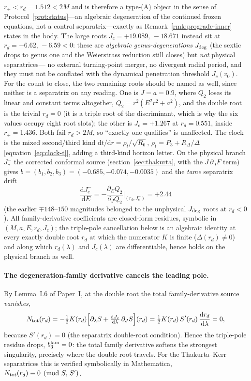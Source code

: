 \documentclass[12pt]{iopart}
\theoremstyle{plain}
\theoremstyle{definition}
\theoremstyle{remark}
\newcommand{\rp}{r_{+}}
\newcommand{\Jc}{J_{c}}
\newcommand{\dd}{\mathrm{d}}
\begin{document}
$\rp<r_d=1.512<2M$ and is therefore a type-(A) object in the sense of
Protocol~\ref{prot:status}---an algebraic degeneration of the continued frozen
equations, not a control separatrix---exactly as Remark~\ref{rmk:prograde-inner}
states in the body. The large
roots $\Jc=+19.089,\,-18.671$ instead sit at $r_d=-6.62,\,-6.59<0$: these are
\emph{algebraic genus-degenerations} $J_{\rm deg}$ (the sextic drops to genus one
and the Weierstrass reduction still closes) but \emph{not} physical separatrices---
no external turning-point merger, no divergent radial period, and they must not be
conflated with the dynamical penetration threshold $J_c(v_0)$. For the count to
close, the two remaining roots should be named as well, since neither is a
separatrix on any reading. One is $J=a=0.9$, where $Q_2$ loses its linear and
constant terms altogether, $Q_2=r^2(E^2r^2+a^2)$, and the double root is the
trivial $r_d=0$ (it is a triple root of the discriminant, which is why the six
values occupy eight root slots); the other is $\Jc=+1.267$ at $r_d=0.551$, inside
$\rp=1.436$. Both fail $r_d>2M$, so ``exactly one qualifies'' is unaffected. The clock is the
mixed second/third kind $\dd t/\dd r=\rho_t/\sqrt{R_6}$, $\rho_t=P_3+R_\Delta/\Delta$
[equation~\eqref{eq:clock-t}], adding a third-kind horizon letter. On the physical branch
$\Jc^-$ the corrected conformal source (section~\ref{sec:thakurta}, with the
$J\,\partial_J F$ term) gives $b=(b_1,b_2,b_3)=(-0.685,-0.074,-0.0035)$ and the
\emph{tame} separatrix drift
\begin{equation}
\frac{\dd\Jc^-}{\dd E}=-\frac{\partial_E Q_2}{\partial_J Q_2}\bigg|_{(r_d,\Jc^-)}=+2.44
\end{equation}
(the earlier $\mp148$--$150$ magnitudes belonged to the unphysical $J_{\rm deg}$
roots at $r_d<0$). All family-derivative coefficients are closed-form residues, symbolic in
$(M,a,E,r_d,\Jc)$; the triple-pole cancellation below is an algebraic identity at every
exactly double root $r_d$ at which the numerator $K$ is finite ($\Delta(r_d)\neq0$) and along
which $r_d(\lambda)$ and $\Jc(\lambda)$ are differentiable, hence holds on the physical branch
as well.

\paragraph{The degeneration-family derivative cancels the leading pole.}
By Lemma~I.6 of Paper~I, at the double root the total family-derivative source \emph{vanishes},
\begin{equation}
N_{\rm tot}(r_d)=-\tfrac12K(r_d)\Big[\partial_\lambda S
+\tfrac{\dd\Jc}{\dd\lambda}\,\partial_JS\Big](r_d)
=\tfrac12K(r_d)\,S'(r_d)\,\frac{\dd r_d}{\dd\lambda}=0,
\label{eq:track-cancel}
\end{equation}
because $S'(r_d)=0$ (the separatrix double-root condition). Hence the triple-pole
residue drops, $b_3^{\rm fam}=0$: the total family derivative softens the
strongest singularity, precisely where the double root travels. For the Thakurta--Kerr
separatrices this is verified symbolically in Mathematica,
$N_{\rm tot}(r_d)\equiv0\pmod{S,\,S'}$.
\end{document}
